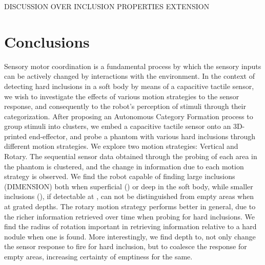 \documentclass[]{interact}
\theoremstyle{plain}%
\theoremstyle{definition}
\theoremstyle{remark}
\begin{document}
DISCUSSION OVER INCLUSION PROPERTIES EXTENSION


\section{Conclusions} \label{sec_conclusion}
Sensory motor coordination is a fundamental process by which the sensory inputs can be actively changed by interactions with the environment. In the context of detecting hard inclusions in a soft body by means of a capacitive tactile sensor, we wish to investigate the effects of various motion strategies to the sensor response, and consequently to the robot's perception of stimuli through their categorization. After proposing an Autonomous Category Formation process to group stimuli into clusters, we embed a capacitive tactile sensor onto an 3D-printed end-effector, and probe a phantom with various hard inclusions through different motion strategies. We explore two motion strategies: Vertical and Rotary. The sequential sensor data obtained through the probing of each area in the phantom is clustered, and the change in information due to each motion strategy is observed. We find the robot capable of finding large inclusions (DIMENSION) both when superficial () or deep  in the soft body, while smaller inclusions (), if detectable at , can not be distinguished from empty areas when at grated depths. The rotary motion strategy performs better in general, due to the richer information retrieved over time when probing for hard inclusions. We find the radius of rotation important in retrieving information relative to a hard nodule when one is found. More interestingly, we find depth to, not only change the sensor response to fire for hard inclusion, but to coalesce the response for empty areas, increasing certainty of emptiness for the same.




\end{document}
